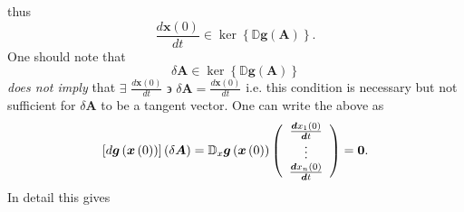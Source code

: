 \documentclass[aps,preprint]{revtex4}%
\begin{document}
thus
\begin{equation}
\frac{d\boldsymbol{x}\left(  0\right)  }{dt}\in\ker\left\{  \mathbb{D}%
\boldsymbol{g}\left(  \boldsymbol{A}\right)  \right\}  .
\end{equation}
One should note that
\begin{equation}
\delta\boldsymbol{A}\in\ker\left\{  \mathbb{D}\boldsymbol{g}\left(
\boldsymbol{A}\right)  \right\}
\end{equation}
\emph{does not imply} that $\exists$ $\frac{d\boldsymbol{x}\left(  0\right)
}{dt}$ $\backepsilon$ $\delta\boldsymbol{A}=\frac{d\boldsymbol{x}\left(
0\right)  }{dt}$ i.e. this condition is necessary but not sufficient for
$\delta\boldsymbol{A}$ to be a tangent vector. One can write the above as
\begin{equation}
\left[  d\boldsymbol{g}\left(  \boldsymbol{x}\left(  0\right)  \right)
\right]  \left(  \delta\boldsymbol{A}\right)  =\mathbb{D}_{x}\boldsymbol{g}%
\left(  \boldsymbol{x}\left(  0\right)  \right)  \left(
\begin{array}
[c]{c}%
\frac{\boldsymbol{d}x_{1}\left(  0\right)  }{\boldsymbol{d}t}\\
\vdots\\
\frac{\boldsymbol{d}x_{n}\left(  0\right)  }{\boldsymbol{d}t}%
\end{array}
\right)  =\boldsymbol{0}.
\end{equation}
In detail this gives
\end{document}
